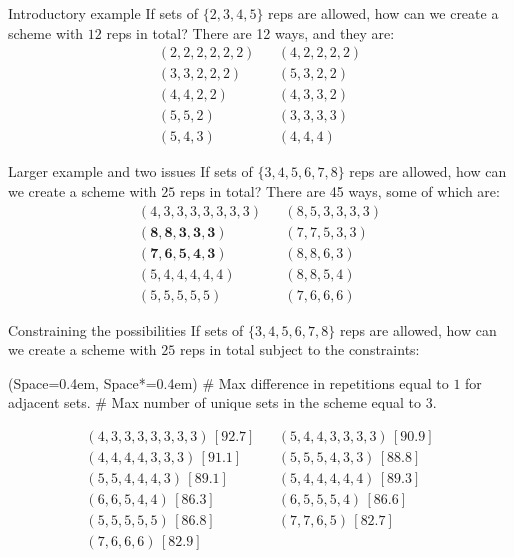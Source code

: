 \documentclass[11pt, aspectratio=149]{beamer}
\newcommand{\listSpace}{0.4em}
\theoremstyle{plain}
\begin{document}
\begin{frame}[fragile, t]{Introductory example}
	\vfill
	If sets of $\{2, 3, 4, 5 \}$ reps are allowed, how can we create a scheme with $12$ reps in total?
	\vfill
There are 12 ways, and they are:
	\vfill
	\begin{align*}
	(2, 2, 2, 2, 2, 2) &&
	(4, 2, 2, 2, 2) \\
	(3, 3, 2, 2, 2) &&
	(5, 3, 2, 2) \\
	(4, 4, 2, 2) &&
	(4, 3, 3, 2) \\
	(5, 5, 2) &&
	(3, 3, 3, 3) \\
	(5, 4, 3) &&
	(4, 4, 4)
	\end{align*}
	\vfill
\end{frame}



\begin{frame}[fragile, t]{Larger example and two issues}
	\vfill
	If sets of $\{3, 4, 5, 6, 7, 8 \}$ reps are allowed, how can we create a scheme with $25$ reps in total?
	\vfill
	There are 45 ways, some of which are:
	\vfill
	\begin{align*}
(4, 3, 3, 3, 3, 3, 3, 3)  &&
(8, 5, 3, 3, 3, 3)  \\
\mathbf{(8, 8, 3, 3, 3)} &&
(7, 7, 5, 3, 3) \\
\mathbf{(7, 6, 5, 4, 3)} &&
(8, 8, 6, 3)  \\
(5, 4, 4, 4, 4, 4)  &&
(8, 8, 5, 4) \\
(5, 5, 5, 5, 5) &&
(7, 6, 6, 6) 
	\end{align*}
	\vfill
\end{frame}


\begin{frame}[fragile, t]{Constraining the possibilities}
	\vfill
	If sets of $\{3, 4, 5, 6, 7, 8 \}$ reps are allowed, how can we create a scheme with $25$ reps in total subject to the constraints:
\vfill
	\begin{easylist}[itemize]
	\ListProperties(Space=\listSpace, Space*=\listSpace)
	# Max difference in repetitions equal to $1$ for adjacent sets.
	# Max number of unique sets in the scheme equal to $3$.
	\end{easylist}
	\vfill
	\begin{align*}
(4, 3, 3, 3, 3, 3, 3, 3) \, [92.7] &&
(5, 4, 4, 3, 3, 3, 3)\, [90.9] \\
(4, 4, 4, 4, 3, 3, 3)\, [91.1] &&
(5, 5, 5, 4, 3, 3)\, [88.8] \\
(5, 5, 4, 4, 4, 3)\, [89.1] &&
(5, 4, 4, 4, 4, 4)\, [89.3] \\
(6, 6, 5, 4, 4) \,[86.3] &&
(6, 5, 5, 5, 4) \,[86.6] \\
(5, 5, 5, 5, 5) \,[86.8] &&
(7, 7, 6, 5) \,[82.7] \\
(7, 6, 6, 6)\, [82.9] &&
	\end{align*}
\end{frame}
\end{document}
